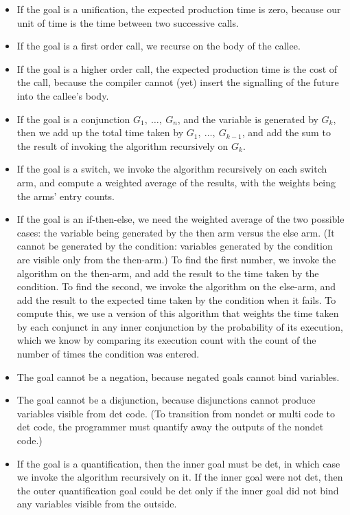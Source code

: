 \begin{itemize}
\item
If the goal is a unification,
the expected production time is zero,
because our unit of time is the time between two successive calls.
\item
If the goal is a first order call,
we recurse on the body of the callee.
\item
If the goal is a higher order call,
the expected production time is the cost of the call,
because the compiler cannot (yet) insert
the signalling of the future into the callee's body.
\item
If the goal is a conjunction $G_1,~\ldots,~G_n$,
and the variable is generated by $G_k$,
then we add up the total time taken by $G_1,~\ldots,~G_{k-1}$,
and add the sum to the result of invoking the algorithm recursively on $G_k$.
\item
If the goal is a switch,
we invoke the algorithm recursively on each switch arm,
and compute a weighted average of the results,
with the weights being the arms' entry counts.
\item
If the goal is an if-then-else,
we need the weighted average of the two possible cases:
the variable being generated by the then arm versus the else arm.
(It cannot be generated by the condition:
variables generated by the condition are visible only from the then-arm.)
To find the first number,
we invoke the algorithm on the then-arm,
and add the result to the time taken by the condition.
To find the second,
we invoke the algorithm on the else-arm,
and add the result to the expected time taken by the condition when it fails.
To compute this, we use a version of this algorithm
that weights the time taken by each conjunct in any inner conjunction
by the probability of its execution,
which we know by comparing its execution count
with the count of the number of times the condition was entered.
\item
The goal cannot be a negation, because negated goals cannot bind variables.
\item
The goal cannot be a disjunction, because
disjunctions cannot produce variables visible from det code.
(To transition from nondet or multi code to det code,
the programmer must quantify away the outputs of the nondet code.)
\item
If the goal is a quantification,
then the inner goal must be det,
in which case we invoke the algorithm recursively on it.
If the inner goal were not det,
then the outer quantification goal could be det
only if the inner goal did not bind any variables visible from the outside.
\end{itemize}

